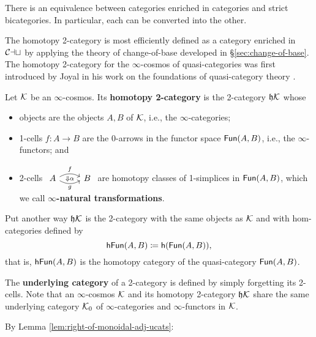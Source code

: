 \begin{prop} There is an equivalence between categories enriched in categories and strict bicategories. In particular, each can be converted into the other.
\end{prop}

The homotopy 2-category is most efficiently defined as a category enriched in ${\mathord{\mathcal{Cat}}}$ by applying the theory of change-of-base developed in \S\ref{sec:change-of-base}. The homotopy 2-category for the $\infty$-cosmos of quasi-categories was first introduced by Joyal in his work on the foundations of quasi-category theory \cite{Joyal:2008tq}.

\begin{defn}\label{defn:homotopy-2-cat} Let ${\mathord{\mathcal{K}}}$ be an $\infty$-cosmos. Its \textbf{homotopy 2-category} is the 2-category $\mathfrak{h}{\mathord{\mathcal{K}}}$ whose
\begin{itemize}
\item objects are the objects $A, B$ of ${\mathord{\mathcal{K}}}$, i.e., the $\infty$-categories;\item 1-cells $f \colon A \to B$ are the 0-arrows in the functor space ${\mathord{\mathsf{Fun}}}(A,B)$, i.e., the $\infty$-functors; and
\item 2-cells $\begin{tikzcd} A \arrow[r, start anchor=15, end anchor=165, bend left, "f"] \arrow[r, start anchor=345, end anchor=195, bend right, "g"'] \arrow[r, phantom, "{\scriptstyle\Downarrow \alpha}"] & B\end{tikzcd}$ are homotopy classes of 1-simplices in ${\mathord{\mathsf{Fun}}}(A,B)$, which we call \textbf{$\infty$-natural transformations}.
\end{itemize}
Put another way $\mathfrak{h}{\mathord{\mathcal{K}}}$ is the 2-category with the same objects as ${\mathord{\mathcal{K}}}$ and with hom-categories defined by
\[ {\mathord{\mathsf{hFun}}}(A,B)   \coloneq {\mathord{\mathsf{h}}}({\mathord{\mathsf{Fun}}}(A,B)),\]
that is, ${\mathord{\mathsf{hFun}}}(A,B)$ is the homotopy category of the quasi-category ${\mathord{\mathsf{Fun}}}(A,B)$.
\end{defn}

\begin{defn}\label{defn:underlying-cat-of-2cat}
The \textbf{underlying category} of a 2-category is defined by simply forgetting its 2-cells. Note that an $\infty$-cosmos ${\mathord{\mathcal{K}}}$ and its homotopy 2-category $\mathfrak{h}{\mathord{\mathcal{K}}}$ share the same underlying category ${\mathord{\mathcal{K}}}_0$ of $\infty$-categories and $\infty$-functors in ${\mathord{\mathcal{K}}}$.
\end{defn}

By Lemma \ref{lem:right-of-monoidal-adj-ucats}:

